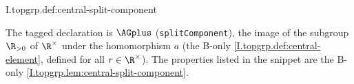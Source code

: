 \begin{definition}[$\AGplus$]
\end{definition}
\begin{tfformal}{I.topgrp.def:central-split-component}
\begin{tffidelity}
The tagged declaration is $\AGplus$ (\texttt{splitComponent}), the image of the subgroup $\R_{>0}$ of $\R^\times$ under the homomorphism $a$ (the B-only \cref{I.topgrp.def:central-element}, defined for all $r\in\R^\times$). The properties listed in the snippet are the B-only \cref{I.topgrp.lem:central-split-component}.
\end{tffidelity}
\end{tfformal}

